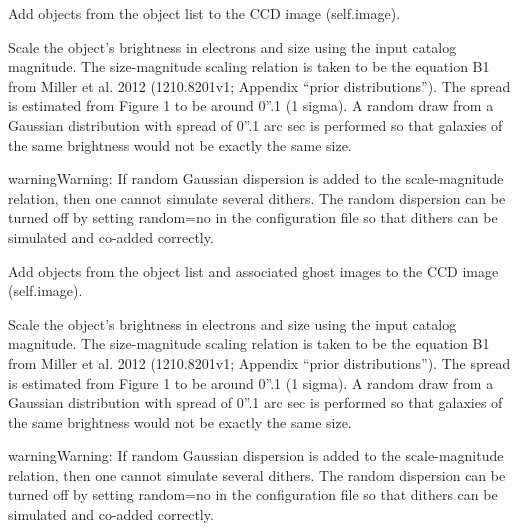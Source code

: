 \documentclass[a4paper,11pt,english]{sphinxmanual}
\begin{document}
\begin{fulllineitems}
\begin{fulllineitems}
\end{fulllineitems}


\begin{fulllineitems}
\label{simulator:simulator.simulator.VISsimulator.addObjects}
Add objects from the object list to the CCD image (self.image).

Scale the object's brightness in electrons and size using the input catalog magnitude.
The size-magnitude scaling relation is taken to be the equation B1 from Miller et al. 2012 (1210.8201v1;
Appendix ``prior distributions''). The spread is estimated from Figure 1 to be around 0''.1 (1 sigma).
A random draw from a Gaussian distribution with spread of 0''.1 arc sec is performed so that galaxies
of the same brightness would not be exactly the same size.

\begin{notice}{warning}{Warning:}
If random Gaussian dispersion is added to the scale-magnitude relation, then one cannot
simulate several dithers. The random dispersion can be turned off by setting random=no in
the configuration file so that dithers can be simulated and co-added correctly.
\end{notice}

\end{fulllineitems}


\begin{fulllineitems}
\label{simulator:simulator.simulator.VISsimulator.addObjectsAndGhosts}
Add objects from the object list and associated ghost images to the CCD image (self.image).

Scale the object's brightness in electrons and size using the input catalog magnitude.
The size-magnitude scaling relation is taken to be the equation B1 from Miller et al. 2012 (1210.8201v1;
Appendix ``prior distributions''). The spread is estimated from Figure 1 to be around 0''.1 (1 sigma).
A random draw from a Gaussian distribution with spread of 0''.1 arc sec is performed so that galaxies
of the same brightness would not be exactly the same size.

\begin{notice}{warning}{Warning:}
If random Gaussian dispersion is added to the scale-magnitude relation, then one cannot
simulate several dithers. The random dispersion can be turned off by setting random=no in
the configuration file so that dithers can be simulated and co-added correctly.
\end{notice}


\end{fulllineitems}
\end{fulllineitems}
\end{document}
